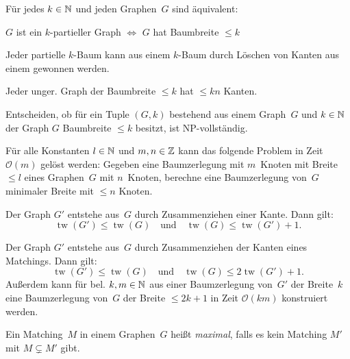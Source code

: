 \documentclass{cheat-sheet}
\renewcommand{\O}{\mathcal{O}} %
\DeclareMathOperator{\treewidth}{tw} %
\begin{document}
\begin{satz}
  Für jedes $k \in \mathbb{N}$ und jeden Graphen~$G$ sind äquivalent:
  \begin{center}
    $G$ ist ein $k$-partieller Graph $\iff$ $G$ hat Baumbreite $\leq k$
  \end{center}
\end{satz}

\begin{lem}
  Jeder partielle $k$-Baum kann aus einem $k$-Baum durch Löschen von Kanten aus einem gewonnen werden.
\end{lem}

\begin{lem}
  Jeder unger. Graph der Baumbreite $\leq k$ hat $\leq k n$ Kanten.
\end{lem}


\begin{bem}
  Entscheiden, ob für ein Tuple $(G, k)$ bestehend aus einem Graph~$G$ und $k \in \mathbb{N}$ der Graph $G$ Baumbreite $\leq k$ besitzt, ist NP-vollständig.
\end{bem}

\begin{lem}
  Für alle Konstanten $l \in \mathbb{N}$ und $m, n \in \mathbb{Z}$ kann das folgende Problem in Zeit~$\O(m)$ gelöst werden:
  Gegeben eine Baumzerlegung mit $m$~Knoten mit Breite $\leq l$ eines Graphen~$G$ mit $n$~Knoten, berechne eine Baumzerlegung von~$G$ minimaler Breite mit $\leq n$ Knoten.
\end{lem}

\begin{lem}
  Der Graph $G'$ entstehe aus~$G$ durch Zusammenziehen einer Kante.
  Dann gilt:
  \[
    \treewidth(G') \leq \treewidth(G)
    \quad \text{und} \quad
    \treewidth(G) \leq \treewidth(G') + 1.
  \]
\end{lem}

\begin{lem}
  Der Graph $G'$ entstehe aus~$G$ durch Zusammenziehen der Kanten eines Matchings.
  Dann gilt:
  \[
    \treewidth(G') \leq \treewidth(G)
    \quad \text{und} \quad
    \treewidth(G) \leq 2 \treewidth(G') + 1.
  \]
  Außerdem kann für bel. $k, m \in \mathbb{N}$ aus einer Baumzerlegung von~$G'$ der Breite~$k$ eine Baumzerlegung von~$G$ der Breite $\leq 2 k + 1$ in Zeit $\O(k m)$ konstruiert werden.
\end{lem}

\begin{defn}
  Ein Matching~$M$ in einem Graphen~$G$ heißt \emph{maximal}, falls es kein Matching $M'$ mit $M \subsetneq M'$ gibt.
\end{defn}
\end{document}
